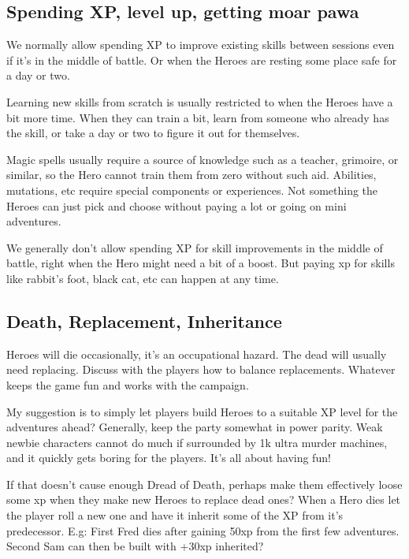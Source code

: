 \subsection*{Spending XP, level up, getting moar pawa}
We normally allow spending XP to improve existing skills between sessions even if it's in the middle of battle. Or when the Heroes are resting some place safe for a day or two.

Learning new skills from scratch is usually restricted to when the Heroes have a bit more time. When they can train a bit, learn from someone who already has the skill, or take a day or two to figure it out for themselves.

Magic spells usually require a source of knowledge such as a teacher, grimoire, or similar, so the Hero cannot train them from zero without such aid. Abilities, mutations, etc require special components or experiences. Not something the Heroes can just pick and choose without paying a lot or going on mini adventures.

We generally don't allow spending XP for skill improvements in the middle of battle, right when the Hero might need a bit of a boost. But paying xp for skills like rabbit's foot, black cat, etc can happen at any time.


\subsection*{Death, Replacement, Inheritance}
Heroes will die occasionally, it's an occupational hazard. The dead will usually need replacing. Discuss with the players how to balance replacements. Whatever keeps the game fun and works with the campaign.

My suggestion is to simply let players build Heroes to a suitable XP level for the adventures ahead? Generally, keep the party somewhat in power parity. Weak newbie characters cannot do much if surrounded by 1k ultra murder machines, and it quickly gets boring for the players. It's all about having fun!

If that doesn't cause enough Dread of Death, perhaps make them effectively loose some xp when they make new Heroes to replace dead ones? When a Hero dies let the player roll a new one and have it inherit some of the XP from it's predecessor.
E.g: First Fred dies after gaining 50xp from the first few adventures. Second Sam can then be built with +30xp inherited?


